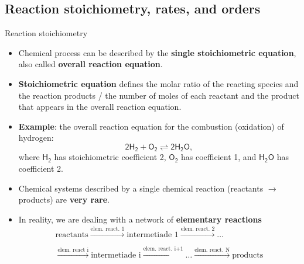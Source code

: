 \subsection{Reaction stoichiometry, rates, and orders}
%
%
\begin{frame}[<+->]{Reaction stoichiometry}
%
\vskip 5pt
\small
\begin{itemize}
	\item Chemical process can be described by the \alert{\textbf{single stoichiometric equation}}, also called  \alert{\textbf{overall reaction equation}}. 
	\item \alert{\textbf{Stoichiometric equation}} defines the molar ratio of the reacting species and the reaction products / the number of moles of each reactant and the product that appears in the overall reaction equation.
	\item {\bf Example}: the overall reaction equation for the \alert{combustion (oxidation) of hydrogen}: %
	\[\mathsf{2 H_2 + O_2 \rightleftharpoons 2H_2O},\] 
	where $\mathsf{H_2}$ has stoichiometric coefficient 2, 
	$\mathsf{O_2}$ has coefficient 1, 
	and $\mathsf{H_2O}$ has coefficient 2.
	\item Chemical systems described by a single chemical reaction (reactants $\rightarrow$ products) are {\bf very rare}. 
	\item In reality, we are dealing with a network of {\bf elementary reactions}
	\begin{multline*}
		\mbox{reactants} 
		\xrightarrow[]{\text{elem. react. 1}} \mbox{intermetiade 1} \xrightarrow[]{\text{elem. react. 2}} \ldots \\
		\xrightarrow[]{\text{elem. react i}} \mbox{intermetiade i} \xrightarrow[]{\text{elem. react. i+1}} \ldots \xrightarrow[]{\text{elem. react. N}} \mbox{products}
	\end{multline*}
\end{itemize}
%
\end{frame}
%
%
